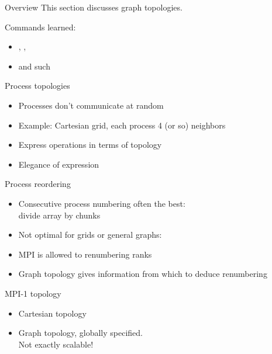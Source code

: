 
\begin{numberedframe}{Overview}
  This section discusses graph topologies.

  Commands learned:
  \begin{itemize}
  \item {}, ,
  \item {} and such
  \end{itemize}
\end{numberedframe}

\begin{numberedframe}{Process topologies}
  \begin{itemize}
  \item Processes don't communicate at random
  \item Example: Cartesian grid, each process 4 (or so) neighbors
  \item Express operations in terms of topology
  \item Elegance of expression
  \end{itemize}
\end{numberedframe}

\begin{numberedframe}{Process reordering}
  \begin{itemize}
  \item Consecutive process numbering often the best:\\
    divide array by chunks
  \item Not optimal for grids or general graphs:
  \item MPI is allowed to renumbering ranks
  \item Graph topology gives information from which to deduce
    renumbering
  \end{itemize}
\end{numberedframe}

\begin{numberedframe}{MPI-1 topology}
  \begin{itemize}
  \item Cartesian topology
  \item Graph topology, globally specified.\\
    Not exactly scalable!
  \end{itemize}
\end{numberedframe}

